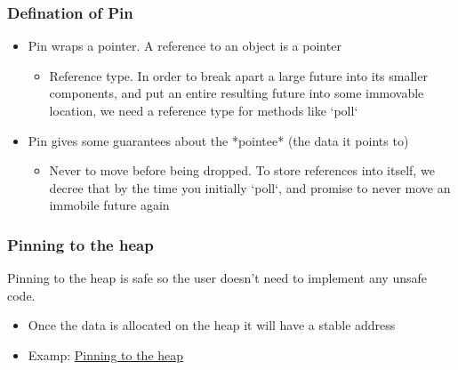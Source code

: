 \begin{frame}[fragile]
    \frametitle{Defination of Pin}
% 
% 
    \begin{itemize}
        \item Pin wraps a pointer. A reference to an object is a pointer
    	\begin{itemize}
    	    \item {\color{red}Reference type}. In order to break apart a large future into its smaller components, and put  an entire resulting future into some immovable location, we need a reference type for methods like `poll`
    	\end{itemize}
        \item Pin gives some guarantees about the *pointee* (the data it points to)
    	\begin{itemize}
    	    \item {\color{red}Never to move before being dropped}. To store references into itself, we decree that by the time you initially `poll`, and promise to never move an immobile future again
    	\end{itemize}
    \end{itemize}
% 
% 
% 
\end{frame}
\begin{frame}[fragile]
    \frametitle{Pinning to the heap}
% 
% 
Pinning to the heap is safe so the user doesn't need to implement any unsafe code.
% 
    \begin{itemize}
        \item Once the data is allocated on the heap it will have a stable address
        \item Examp: \href{https://cfsamson.github.io/books-futures-explained/4_pin.html#pinning-to-the-heap}{Pinning to the heap}
    \end{itemize}

\end{frame}

